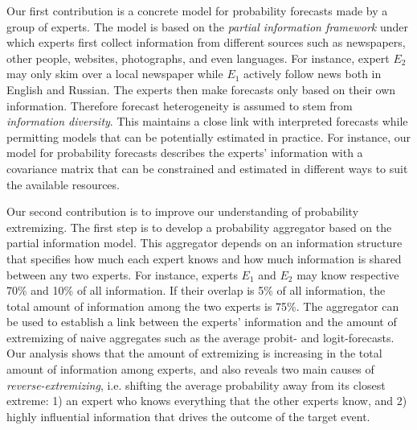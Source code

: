 \documentclass[11pt]{article}
\theoremstyle{definition}
\theoremstyle{definition}
\begin{document}
Our first contribution is a concrete model for probability forecasts made by a group of experts. The model is based on the \textit{partial information framework} under which experts first collect information from different sources such as newspapers, other people, websites, photographs, and even languages. For instance, expert $E_2$ may only skim over a local newspaper while $E_1$ actively follow news both in English and Russian. The experts then make forecasts only based on their own information.
Therefore forecast heterogeneity is assumed to stem from \textit{information diversity}. This maintains a close link with interpreted forecasts while permitting models that can be potentially estimated in practice. For instance, our model for probability forecasts describes the experts' information with a covariance matrix that can be constrained and estimated in different ways to suit the available resources. 


Our second contribution is to improve our understanding of probability extremizing. The first step is to develop a probability aggregator based on the partial information model. This aggregator depends on an information structure that specifies how much each expert knows and how much information is shared between any two experts. For instance, experts $E_1$ and $E_2$ may know respective 70\% and 10\% of all information. If their overlap is 5\% of all information, the total amount of information among the two experts is 75\%. The aggregator can be used to establish a link between the experts' information and the amount of extremizing of naive aggregates such as the average probit- and logit-forecasts. Our analysis shows that the amount of extremizing is increasing in the total amount of information among experts, and also reveals two main causes of \textit{reverse-extremizing}, i.e. shifting the average probability away from its closest extreme: 1) an expert who knows everything that the other experts know, and 2) highly influential information that drives the outcome of the target event. 
\end{document}
